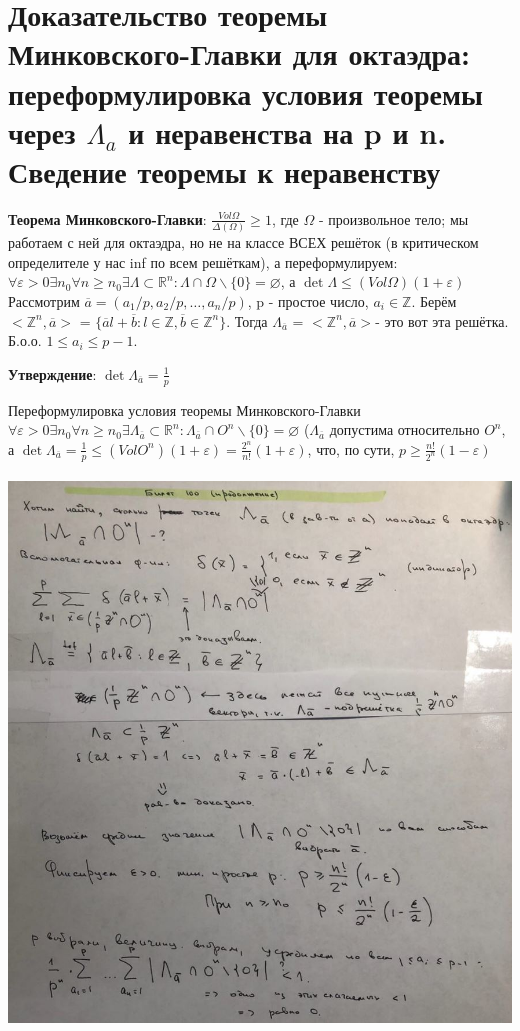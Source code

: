 \setcounter{section}{99}
\section{Доказательство теоремы Минковского-Главки для октаэдра: переформулировка условия теоремы через $\Lambda_a$ и неравенства на p и n. Сведение теоремы к неравенству}
\textbf{Теорема Минковского-Главки}: $\frac{Vol \Omega}{\Delta(\Omega)} \geqslant 1$, где $\Omega$ - произвольное тело; мы работаем с ней для октаэдра, но не на классе ВСЕХ решёток (в критическом определителе у нас inf по всем решёткам), а переформулируем: \\
$\forall \varepsilon > 0 \exists n_0 \forall n \geqslant n_0 \exists \Lambda \subset \mathbb{R}^n: \Lambda \cap \Omega \backslash \{0\} = \varnothing$, а $\det \Lambda \leqslant (Vol \Omega)(1 + \varepsilon)$ \\
Рассмотрим $\overline{a} = (a_1/p, a_2/p, \dots, a_n/p)$, p - простое число, $a_i \in \mathbb{Z}$. Берём $<\mathbb{Z}^n, \overline{a}>$ = $\{\overline{a}l + \overline{b}: l \in \mathbb{Z}, \overline{b} \in \mathbb{Z}^n\}$. Тогда $\Lambda_{\overline{a}}$ = $<\mathbb{Z}^n, \overline{a}>$- это вот эта решётка. Б.о.о. $1 \leqslant a_i \leqslant p - 1$. \par
\textbf{Утверждение}: $\det\Lambda_{\overline{a}} = \frac{1}{p}$ \par
$\textbf{Переформулировка условия теоремы Минковского-Главки}$ $\forall \varepsilon > 0 \exists n_0 \forall n \geqslant n_0 \exists \Lambda_{\overline{a}} \subset \mathbb{R}^n: \Lambda_{\overline{a}} \cap O^n \backslash \{0\} = \varnothing$ ($\Lambda_{\overline{a}}$ допустима относительно $O^n$, а $\det \Lambda_{\overline{a}} = \frac{1}{p} \leqslant (Vol O^n)(1 + \varepsilon) = \frac{2^n}{n!}(1+\varepsilon)$, что, по сути, $p \geqslant \frac{n!}{2^n}(1-\varepsilon)$ \\
\\
\includegraphics[width=15cm]{images/100_1}

